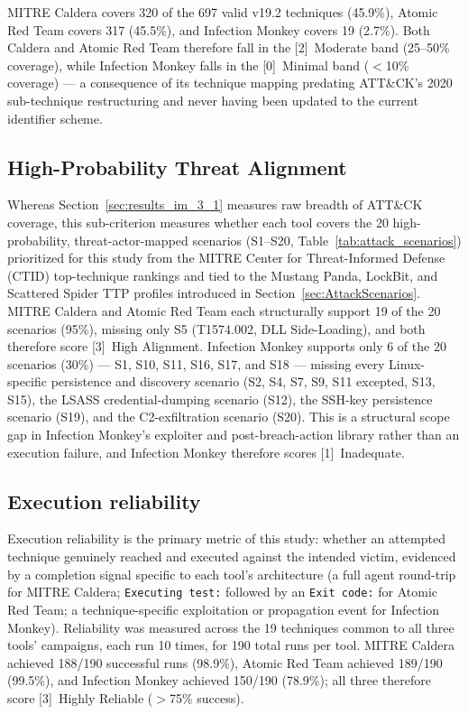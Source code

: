 MITRE Caldera covers 320 of the 697 valid v19.2 techniques (45.9\%), Atomic Red Team covers 317 (45.5\%), and Infection Monkey covers 19 (2.7\%). Both Caldera and Atomic Red Team therefore fall in the [2]~Moderate band (25--50\% coverage), while Infection Monkey falls in the [0]~Minimal band ($<$10\% coverage) --- a consequence of its technique mapping predating ATT\&CK's 2020 sub-technique restructuring and never having been updated to the current identifier scheme.

\subsection{High-Probability Threat Alignment}\label{sec:results_im_3_2}

Whereas Section~\ref{sec:results_im_3_1} measures raw breadth of ATT\&CK coverage, this sub-criterion measures whether each tool covers the 20 high-probability, threat-actor-mapped scenarios (S1--S20, Table~\ref{tab:attack_scenarios}) prioritized for this study from the MITRE Center for Threat-Informed Defense (CTID) top-technique rankings and tied to the Mustang Panda, LockBit, and Scattered Spider TTP profiles introduced in Section~\ref{sec:AttackScenarios}. MITRE Caldera and Atomic Red Team each structurally support 19 of the 20 scenarios (95\%), missing only S5 (T1574.002, DLL Side-Loading), and both therefore score [3]~High Alignment. Infection Monkey supports only 6 of the 20 scenarios (30\%) --- S1, S10, S11, S16, S17, and S18 --- missing every Linux-specific persistence and discovery scenario (S2, S4, S7, S9, S11 excepted, S13, S15), the LSASS credential-dumping scenario (S12), the SSH-key persistence scenario (S19), and the C2-exfiltration scenario (S20). This is a structural scope gap in Infection Monkey's exploiter and post-breach-action library rather than an execution failure, and Infection Monkey therefore scores [1]~Inadequate.

\subsection{Execution reliability}\label{sec:results_im_3_3}

Execution reliability is the primary metric of this study: whether an attempted technique genuinely reached and executed against the intended victim, evidenced by a completion signal specific to each tool's architecture (a full agent round-trip for MITRE Caldera; \texttt{Executing test:} followed by an \texttt{Exit code:} for Atomic Red Team; a technique-specific exploitation or propagation event for Infection Monkey). Reliability was measured across the 19 techniques common to all three tools' campaigns, each run 10 times, for 190 total runs per tool. MITRE Caldera achieved 188/190 successful runs (98.9\%), Atomic Red Team achieved 189/190 (99.5\%), and Infection Monkey achieved 150/190 (78.9\%); all three therefore score [3]~Highly Reliable ($>$75\% success).

